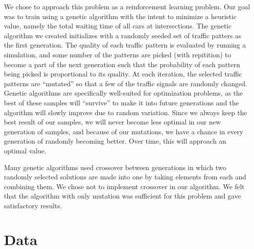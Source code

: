 \documentclass[12pt, letterpaper]{article}
\begin{document}
We chose to approach this problem as a reinforcement learning problem.
Our goal was to train using a genetic algorithm with the intent to minimize a heuristic value, namely the total waiting time of all cars at intersections.
The genetic algorithm we created initializes with a randomly seeded set of traffic patters as the first generation.
The quality of each traffic pattern is evaluated by running a simulation, and some number of the patterns are picked (with repitition) to become a part of the next generation such that the probability of each pattern being picked is proportional to its quality.
At each iteration, the selected traffic patterns are ``mutated'' so that a few of the traffic signals are randomly changed.
Genetic algorithms are specifically well-suited for optimization problems, as the best of these samples will ``survive'' to make it into future generations and the algorithm will slowly improve due to random variation.
Since we always keep the best result of our samples, we will never become less optimal in our new generation of samples, and because of our mutations, we have a chance in every generation of randomly becoming better.
Over time, this will approach an optimal value.

Many genetic algorithms used crossover between generations in which two randomly selected solutions are made into one by taking elements from each and combining them.
We chose not to implement crossover in our algorithm.
We felt that the algorithm with only mutation was sufficient for this problem and gave satisfactory results.


\section*{Data}
\end{document}
